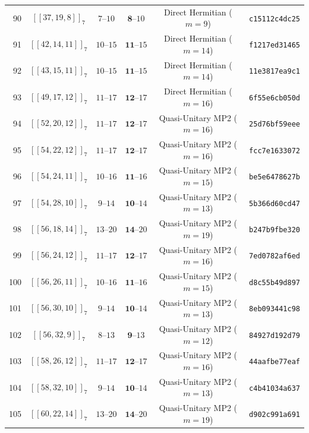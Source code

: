 \documentclass[11pt,a4paper]{article}
\theoremstyle{remark}
\begin{document}
{\begin{longtable}{@{}rccccl@{}}
90 & $[[37,19,8]]_{7}$ & $7\text{--}10$ & $\mathbf{8}\text{--}10$ & Direct Hermitian ($m=9$) & \texttt{c15112c4dc25} \\
91 & $[[42,14,11]]_{7}$ & $10\text{--}15$ & $\mathbf{11}\text{--}15$ & Direct Hermitian ($m=14$) & \texttt{f1217ed31465} \\
92 & $[[43,15,11]]_{7}$ & $10\text{--}15$ & $\mathbf{11}\text{--}15$ & Direct Hermitian ($m=14$) & \texttt{11e3817ea9c1} \\
93 & $[[49,17,12]]_{7}$ & $11\text{--}17$ & $\mathbf{12}\text{--}17$ & Direct Hermitian ($m=16$) & \texttt{6f55e6cb050d} \\
94 & $[[52,20,12]]_{7}$ & $11\text{--}17$ & $\mathbf{12}\text{--}17$ & Quasi-Unitary MP2 ($m=16$) & \texttt{25d76bf59eee} \\
95 & $[[54,22,12]]_{7}$ & $11\text{--}17$ & $\mathbf{12}\text{--}17$ & Quasi-Unitary MP2 ($m=16$) & \texttt{fcc7e1633072} \\
96 & $[[54,24,11]]_{7}$ & $10\text{--}16$ & $\mathbf{11}\text{--}16$ & Quasi-Unitary MP2 ($m=15$) & \texttt{be5e6478627b} \\
97 & $[[54,28,10]]_{7}$ & $9\text{--}14$ & $\mathbf{10}\text{--}14$ & Quasi-Unitary MP2 ($m=13$) & \texttt{5b366d60cd47} \\
98 & $[[56,18,14]]_{7}$ & $13\text{--}20$ & $\mathbf{14}\text{--}20$ & Quasi-Unitary MP2 ($m=19$) & \texttt{b247b9fbe320} \\
99 & $[[56,24,12]]_{7}$ & $11\text{--}17$ & $\mathbf{12}\text{--}17$ & Quasi-Unitary MP2 ($m=16$) & \texttt{7ed0782af6ed} \\
100 & $[[56,26,11]]_{7}$ & $10\text{--}16$ & $\mathbf{11}\text{--}16$ & Quasi-Unitary MP2 ($m=15$) & \texttt{d8c55b49d897} \\
101 & $[[56,30,10]]_{7}$ & $9\text{--}14$ & $\mathbf{10}\text{--}14$ & Quasi-Unitary MP2 ($m=13$) & \texttt{8eb093441c98} \\
102 & $[[56,32,9]]_{7}$ & $8\text{--}13$ & $\mathbf{9}\text{--}13$ & Quasi-Unitary MP2 ($m=12$) & \texttt{84927d192d79} \\
103 & $[[58,26,12]]_{7}$ & $11\text{--}17$ & $\mathbf{12}\text{--}17$ & Quasi-Unitary MP2 ($m=16$) & \texttt{44aafbe77eaf} \\
104 & $[[58,32,10]]_{7}$ & $9\text{--}14$ & $\mathbf{10}\text{--}14$ & Quasi-Unitary MP2 ($m=13$) & \texttt{c4b41034a637} \\
105 & $[[60,22,14]]_{7}$ & $13\text{--}20$ & $\mathbf{14}\text{--}20$ & Quasi-Unitary MP2 ($m=19$) & \texttt{d902c991a691} \\

\end{longtable}}
\end{document}
